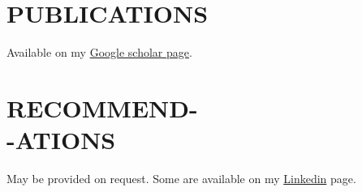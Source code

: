 \documentclass[margin, 10pt]{res} %
\begin{document}
\begin{resume}
\section{PUBLICATIONS} 
Available on my \href{https://scholar.google.com/citations?user=HjM0XDoAAAAJ&hl=en}{Google scholar page}.



\section{RECOMMEND- \\-ATIONS } 
May be provided on request. Some are available on my \href{https://www.linkedin.com/in/ikramu/}{Linkedin} page.  %


\end{resume}
\end{document}
